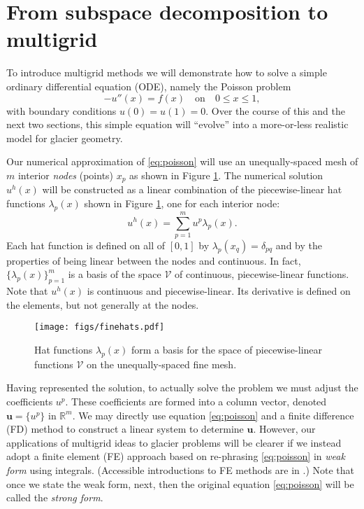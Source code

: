 \documentclass[letterpaper,final,12pt,reqno]{amsart}
\newcommand{\RR}{\mathbb{R}}
\newcommand{\bu}{\mathbf{u}}
\begin{document}
\section{From subspace decomposition to multigrid} \label{sec:subspace}

To introduce multigrid methods we will demonstrate how to solve a simple ordinary differential equation (ODE), namely the Poisson problem
\begin{equation}
- u''(x) = f(x) \quad \text{on} \quad 0 \le x \le 1, \label{eq:poisson}
\end{equation}
with boundary conditions $u(0)=u(1)=0$.  Over the course of this and the next two sections, this simple equation will ``evolve'' into a more-or-less realistic model for glacier geometry.

Our numerical approximation of \eqref{eq:poisson} will use an unequally-spaced mesh of $m$ interior \emph{nodes} (points) $x_p$ as shown in Figure \ref{fig:finehats}.  The numerical solution $u^h(x)$ will be constructed as a linear combination of the piecewise-linear hat functions $\lambda_p(x)$ shown in Figure \ref{fig:finehats}, one for each interior node:
\begin{equation}
u^h(x) = \sum_{p=1}^m u^p \lambda_p(x). \label{eq:trialsolution}
\end{equation}
Each hat function is defined on all of $[0,1]$ by $\lambda_p(x_q) = \delta_{pq}$ and by the properties of being linear between the nodes and continuous.  In fact, $\{\lambda_p(x)\}_{p=1}^m$ is a basis of the space $\mathcal{V}$ of continuous, piecewise-linear functions.  Note that $u^h(x)$ is continuous and piecewise-linear.  Its derivative is defined on the elements, but not generally at the nodes.

\begin{figure}
\texttt{[image: figs/finehats.pdf]}
\caption{Hat functions $\lambda_p(x)$ form a basis for the space of piecewise-linear functions $\mathcal{V}$ on the unequally-spaced fine mesh.}
\label{fig:finehats}
\end{figure}

Having represented the solution, to actually solve the problem we must adjust the coefficients $u^p$.  These coefficients are formed into a column vector, denoted $\bu=\{u^p\}$ in $\RR^m$.  We may directly use equation \eqref{eq:poisson} and a finite difference (FD) method \cite{LeVeque2007} to construct a linear system to determine $\bu$.  However, our applications of multigrid ideas to glacier problems will be clearer if we instead adopt a finite element (FE) approach based on re-phrasing \eqref{eq:poisson} in \emph{weak form} using integrals.  (Accessible introductions to FE methods are in \cite{Bueler2021,Elmanetal2014,Johnson2009}.)  Note that once we state the weak form, next, then the original equation \eqref{eq:poisson} will be called the \emph{strong form}.
\end{document}
